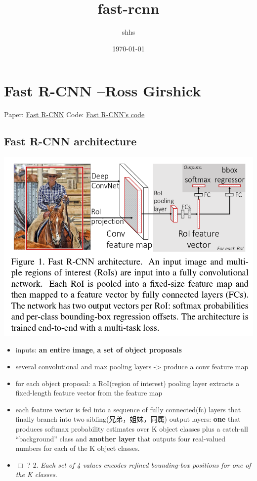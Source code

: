 \documentclass[11pt]{article}
\title{fast-rcnn}
\author{shhs}
\date{\today}
\begin{document}
\maketitle

\setcounter{tocdepth}{3}
\tableofcontents
\vspace*{1cm}

\section{Fast R-CNN --Ross Girshick}
\label{sec-1}


Paper: \href{http://arxiv.org/abs/1504.08083}{Fast R-CNN}
Code: \href{https://github.com/rbgirshick/fast-rcnn}{Fast R-CNN's code}
\subsection{Fast R-CNN architecture}
\label{sec-1-1}


   \includegraphics[width=.9\linewidth]{./pic_fast_rcnn/1.png}
\begin{itemize}
\item inputs: \textbf{an entire image}, \textbf{a set of object proposals}
\item several convolutional and max pooling layers -> produce a conv feature map
\item for each object proposal: a RoI(region of interest) pooling layer extracts a 
     fixed-length feature vector from the feature map
\item each feature vector is fed into a sequence of fully connected(fc) layers 
     that finally branch into two sibling(兄弟，姐妹，同属) output layers:
     \textbf{one} that produces softmax probability estimates over K object classes
     plus a catch-all ``background'' class and \textbf{another layer} that outputs 
     four real-valued numbers for each of the K object classes.
\item $\Box$ ? 2. \emph{Each set of 4 values encodes refined bounding-box positions for one of            the K classes.}
\end{itemize}
\end{document}
